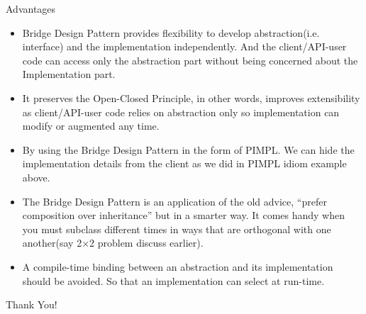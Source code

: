 \documentclass[13pt]{beamer}
\begin{document}
\begin{frame}{Advantages}
	\textcolor{blue}{}
	\begin{itemize}
		\item Bridge Design Pattern provides flexibility to develop abstraction(i.e. interface) and the implementation independently. And the client/API-user code can access only the abstraction part without being concerned about the Implementation part.
		\item It preserves the Open-Closed Principle, in other words, improves extensibility as client/API-user code relies on abstraction only so implementation can modify or augmented any time.
		\item By using the Bridge Design Pattern in the form of PIMPL. We can hide the implementation details from the client as we did in PIMPL idiom example above.
		\item The Bridge Design Pattern is an application of the old advice, “prefer composition over inheritance” but in a smarter way. It comes handy when you must subclass different times in ways that are orthogonal with one another(say 2×2 problem discuss earlier).
		\item A compile-time binding between an abstraction and its implementation should be avoided. So that an implementation can select at run-time.
	\end{itemize}
\end{frame}

\begin{frame}
\begin{center}
{\fontsize{40}{50}\selectfont Thank You!}
\end{center}
\end{frame}
\end{document}
